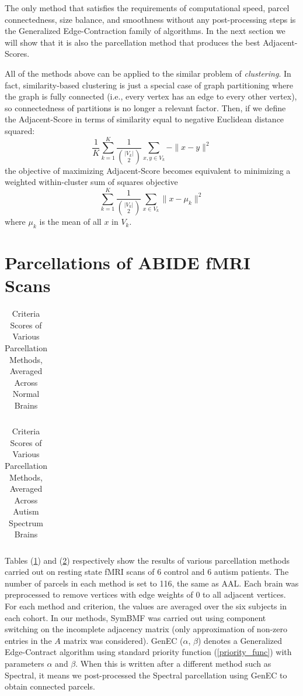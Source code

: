 The only method that satisfies the requirements of computational speed,
parcel connectedness, size balance, and smoothness without any
post-processing steps is the Generalized Edge-Contraction family of
algorithms. In the next section we will show that it is also the
parcellation method that produces the best Adjacent-Scores.

All of the methods above can be applied to the similar problem of
\textit{clustering}. In fact, similarity-based clustering is just a
special case of graph partitioning where the graph is fully connected
(i.e., every vertex has an edge to every other vertex), so connectedness
of partitions is no longer a relevant factor. Then, if we define the
Adjacent-Score in terms of similarity equal to negative Euclidean
distance squared:
\[ \frac{1}{K}\sum_{k=1}^K \frac{1}{{|V_k| \choose 2}}
   \sum_{x,y \in V_k} - \|x - y\|^2 \]
the objective of maximizing Adjacent-Score becomes equivalent to 
minimizing a weighted within-cluster sum of squares objective
\[ \sum_{k=1}^K \frac{1}{{|V_k| \choose 2}}
   \sum_{x \in V_k} \|x - \mu_k\|^2 \]
where $\mu_k$ is the mean of all $x$ in $V_k$.

\section{Parcellations of ABIDE fMRI Scans}

\begin{table}
\caption{Criteria Scores of Various Parcellation Methods, %
Averaged Across Normal Brains}
\label{normal}
\begin{tabular}{l | r r r r r r}

\end{tabular}
\end{table}

\begin{table}
\caption{Criteria Scores of Various Parcellation Methods, %
Averaged Across Autism Spectrum Brains}
\label{autism}
\begin{tabular}{l | r r r r r r}

\end{tabular}
\end{table}

Tables (\ref{normal}) and (\ref{autism}) respectively show the results
of various parcellation methods carried out on resting state fMRI scans
of 6 control and 6 autism patients. The number of parcels in each
method is set to 116, the same as AAL. Each brain was preprocessed to
remove vertices with edge weights of 0 to all adjacent vertices. For
each method and criterion, the values are averaged over the six 
subjects in each cohort. In our methods, SymBMF was carried out using
component switching on the incomplete adjacency matrix (only
approximation of non-zero entries in the $A$ matrix was considered).
GenEC ($\alpha$, $\beta$) denotes a Generalized Edge-Contract
algorithm using standard priority function (\ref{priority_func}) with
parameters $\alpha$ and $\beta$. When this is written after a different
method such as Spectral, it means we post-processed the Spectral
parcellation using GenEC to obtain connected parcels.

